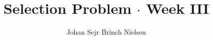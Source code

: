 \makeatletter %
\def\maketitle{%
 \null
 \thispagestyle{empty}%
 \vfill
 \begin{center}\leavevmode
   \normalfont
   \LARGE{\raggedleft \@title\par}%
   \hrulefill\par
   \large{\raggedleft \subtitle\par}%
   \vskip 2cm
   {\today\par}%
 \end{center}%
 \vfill
 \begin{flushleft}
   {\large \@author } \\
   {\footnotesize \suplementInfo }
 \end{flushleft}
 \clearpage %
}
\makeatother %
\title{Selection Problem $\cdot$ Week III}

\def\subtitle{Data Structures: Theory and Practice}

\author{Johan Sejr Brinch Nielsen} \def\suplementInfo{

\kern 5pt \hrule width 11pc \kern 5pt

\begin{tabular}{ll}
Email: & zerrez@diku.dk  \\
Cpr.:  & 260886-2547
\end{tabular}

\kern 5pt \hrule width 11pc \kern 5pt

Dept. of Computer Science,  \\
University of Copenhagen

}
